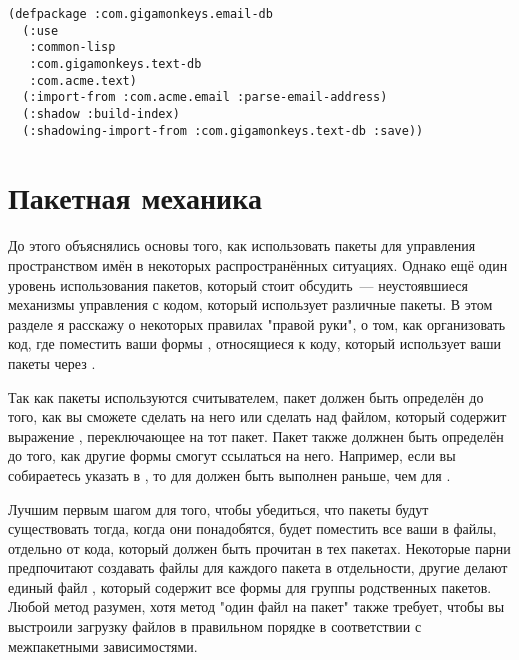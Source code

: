 \begin{lstlisting}
(defpackage :com.gigamonkeys.email-db
  (:use
   :common-lisp
   :com.gigamonkeys.text-db
   :com.acme.text)
  (:import-from :com.acme.email :parse-email-address)
  (:shadow :build-index)
  (:shadowing-import-from :com.gigamonkeys.text-db :save))
\end{lstlisting}

\section{Пакетная механика}

До этого объяснялись основы того, как использовать пакеты для управления пространством
имён в некоторых распространённых ситуациях. Однако ещё один уровень использования
пакетов, который стоит обсудить~--- неустоявшиеся механизмы управления с кодом, который
использует различные пакеты. В этом разделе я расскажу о некоторых правилах "правой руки",
о том, как организовать код, где поместить ваши формы , относящиеся к
коду, который использует ваши пакеты через .

Так как пакеты используются считывателем, пакет должен быть определён до того, как вы
сможете сделать  на него или сделать  над файлом, который
содержит выражение , переключающее на тот пакет. Пакет также должнен быть
определён до того, как другие формы  смогут ссылаться на него. Например,
если вы собираетесь указать  в
, то  для 
должен быть выполнен раньше, чем  для .

Лучшим первым шагом для того, чтобы убедиться, что пакеты будут существовать тогда, когда
они понадобятся, будет поместить все ваши  в файлы, отдельно от кода,
который должен быть прочитан в тех пакетах. Некоторые парни предпочитают создавать файлы
 для каждого пакета в отдельности, другие делают единый файл
, который содержит все  формы для группы родственных
пакетов. Любой метод разумен, хотя метод "один файл на пакет" также требует, чтобы вы
выстроили загрузку файлов в правильном порядке в соответствии с межпакетными
зависимостями.

